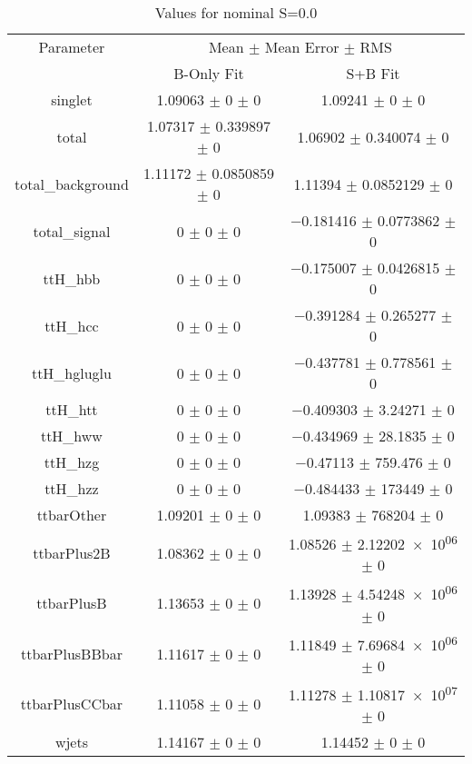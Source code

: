 \begin{table}
\centering
\caption{Values for nominal S=0.0}
\begin{tabular}{ccc}
\toprule
Parameter & \multicolumn{2}{c}{Mean $\pm$ Mean Error $\pm$ RMS}\\
 & B-Only Fit & S+B Fit\\
\midrule
singlet & \num{1.09063} $\pm$ \num{0} $\pm$ \num{0} & \num{1.09241} $\pm$ \num{0} $\pm$ \num{0}\\
total & \num{1.07317} $\pm$ \num{0.339897} $\pm$ \num{0} & \num{1.06902} $\pm$ \num{0.340074} $\pm$ \num{0}\\
total\_background & \num{1.11172} $\pm$ \num{0.0850859} $\pm$ \num{0} & \num{1.11394} $\pm$ \num{0.0852129} $\pm$ \num{0}\\
total\_signal & \num{0} $\pm$ \num{0} $\pm$ \num{0} & \num{-0.181416} $\pm$ \num{0.0773862} $\pm$ \num{0}\\
ttH\_hbb & \num{0} $\pm$ \num{0} $\pm$ \num{0} & \num{-0.175007} $\pm$ \num{0.0426815} $\pm$ \num{0}\\
ttH\_hcc & \num{0} $\pm$ \num{0} $\pm$ \num{0} & \num{-0.391284} $\pm$ \num{0.265277} $\pm$ \num{0}\\
ttH\_hgluglu & \num{0} $\pm$ \num{0} $\pm$ \num{0} & \num{-0.437781} $\pm$ \num{0.778561} $\pm$ \num{0}\\
ttH\_htt & \num{0} $\pm$ \num{0} $\pm$ \num{0} & \num{-0.409303} $\pm$ \num{3.24271} $\pm$ \num{0}\\
ttH\_hww & \num{0} $\pm$ \num{0} $\pm$ \num{0} & \num{-0.434969} $\pm$ \num{28.1835} $\pm$ \num{0}\\
ttH\_hzg & \num{0} $\pm$ \num{0} $\pm$ \num{0} & \num{-0.47113} $\pm$ \num{759.476} $\pm$ \num{0}\\
ttH\_hzz & \num{0} $\pm$ \num{0} $\pm$ \num{0} & \num{-0.484433} $\pm$ \num{173449} $\pm$ \num{0}\\
ttbarOther & \num{1.09201} $\pm$ \num{0} $\pm$ \num{0} & \num{1.09383} $\pm$ \num{768204} $\pm$ \num{0}\\
ttbarPlus2B & \num{1.08362} $\pm$ \num{0} $\pm$ \num{0} & \num{1.08526} $\pm$ \num{2.12202e+06} $\pm$ \num{0}\\
ttbarPlusB & \num{1.13653} $\pm$ \num{0} $\pm$ \num{0} & \num{1.13928} $\pm$ \num{4.54248e+06} $\pm$ \num{0}\\
ttbarPlusBBbar & \num{1.11617} $\pm$ \num{0} $\pm$ \num{0} & \num{1.11849} $\pm$ \num{7.69684e+06} $\pm$ \num{0}\\
ttbarPlusCCbar & \num{1.11058} $\pm$ \num{0} $\pm$ \num{0} & \num{1.11278} $\pm$ \num{1.10817e+07} $\pm$ \num{0}\\
wjets & \num{1.14167} $\pm$ \num{0} $\pm$ \num{0} & \num{1.14452} $\pm$ \num{0} $\pm$ \num{0}\\
\bottomrule
\end{tabular}
\end{table}